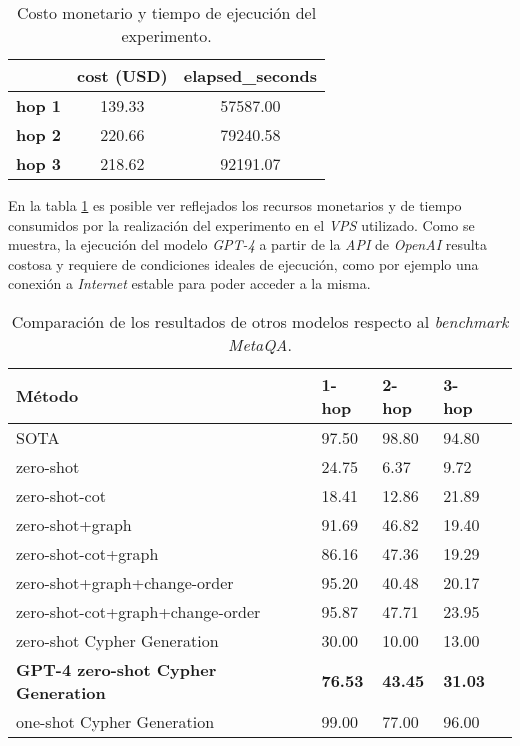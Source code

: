 \begin{table}[H]
\centering
\begin{tabular}{|c|c|c|}
\hline
& \textbf{cost (USD)} & \textbf{elapsed\_seconds} \\ \hline
\textbf{hop 1} & 139.33 & 57587.00 \\ \hline
\textbf{hop 2} & 220.66 & 79240.58 \\ \hline
\textbf{hop 3} & 218.62 & 92191.07 \\ \hline
\end{tabular}
\caption{Costo monetario y tiempo de ejecución del experimento.}
\label{tab:results2}
\end{table}

En la tabla \ref{tab:results2} es posible ver reflejados los recursos monetarios y de tiempo consumidos por la realización del experimento en el \textit{VPS} utilizado. Como se muestra, la ejecución del modelo \textit{GPT-4} a partir de la \textit{API} de \textit{OpenAI} resulta costosa y requiere de condiciones ideales de ejecución, como por ejemplo una conexión a \textit{Internet} estable para poder acceder a la misma.

\begin{table}[H]
\centering
\begin{tabular}{|l|l|l|l|l}
\hline
Método & 1-hop & 2-hop & 3-hop \\
\hline
SOTA  & 97.50 & 98.80 & 94.80 \\
\hline
zero-shot  & 24.75 & 6.37 & 9.72 \\
\hline
zero-shot-cot & 18.41 & 12.86 & 21.89 \\
\hline
zero-shot+graph & 91.69 & 46.82 & 19.40 \\
\hline
zero-shot-cot+graph & 86.16 & 47.36 & 19.29 \\
\hline
zero-shot+graph+change-order & 95.20 & 40.48 & 20.17 \\
\hline
zero-shot-cot+graph+change-order & 95.87 & 47.71 & 23.95 \\
\hline
zero-shot Cypher Generation  & 30.00 & 10.00 & 13.00 \\
\hline
\textbf{GPT-4 zero-shot Cypher Generation}  & \textbf{76.53} & \textbf{43.45} & \textbf{31.03} \\
\hline
one-shot Cypher Generation & 99.00 & 77.00 & 96.00 \\
\hline
\end{tabular}
\caption{Comparación de los resultados de otros modelos respecto al \textit{benchmark MetaQA}.}
\label{tab:results3}
\end{table}


